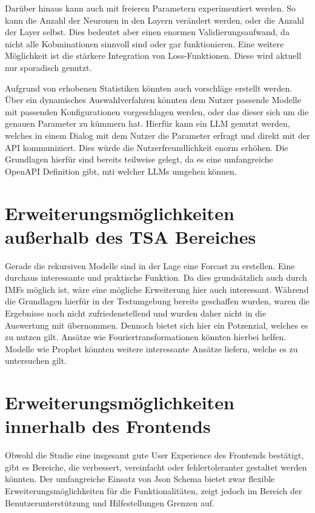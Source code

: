Darüber hinaus kann auch mit freieren Parametern experimentiert werden. So kann die Anzahl der Neuronen in den Layern verändert werden, oder die Anzahl der Layer selbst.
Dies bedeutet aber einen enormen Validierungsaufwand, da nicht alle Kobminationen sinnvoll sind oder gar funktionieren. Eine weitere Möglichkeit ist die stärkere Integration von Loss-Funktionen. Diese wird aktuell nur sporadisch genutzt.

Aufgrund von erhobenen Statistiken könnten auch vorschläge erstellt werden. Über ein dynamisches Auswahlverfahren könnten dem Nutzer passende Modelle mit passenden Konfigurationen vorgeschlagen werden, oder das dieser sich um die genauen Parameter zu kümmern hat.
Hierfür kann ein \acf{LLM} genutzt werden, welches in einem Dialog mit dem Nutzer die Parameter erfragt und direkt mit der API kommuniziert. Dies würde die Nutzerfreundlichkeit enorm erhöhen.
Die Grundlagen hierfür sind bereits teilweise gelegt, da es eine umfangreiche OpenAPI Definition gibt, mti welcher LLMs umgehen können.

\section{Erweiterungsmöglichkeiten außerhalb des TSA Bereiches}
Gerade die rekursiven Modelle sind in der Lage eine Forcast zu erstellen. Eine durchaus interessante und praktische Funktion.
Da dies grundsätzlich auch durch \ac{IMF}s möglich ist, wäre eine mögliche Erweiterung hier auch interessant.
Während die Grundlagen hierfür in der Testumgebung bereits geschaffen wurden, waren die Ergebnisse noch nicht zufriedenstellend und wurden daher nicht in die Auswertung mit übernommen.
Dennoch bietet sich hier ein Potzenzial, welches es zu nutzen gilt. Ansätze wie Fouriertransformationen könnten hierbei helfen.
Modelle wie Prophet könnten weitere interessante Ansätze liefern, welche es zu untersuchen gilt.

\section{Erweiterungsmöglichkeiten innerhalb des Frontends}
Obwohl die Studie eine insgesamt gute User Experience des Frontends bestätigt, gibt es Bereiche, die verbessert, vereinfacht oder fehlertoleranter gestaltet werden könnten. 
Der umfangreiche Einsatz von Json Schema bietet zwar flexible Erweiterungsmöglichkeiten für die Funktionalitäten, zeigt jedoch im Bereich der Benutzerunterstützung und Hilfestellungen Grenzen auf.

